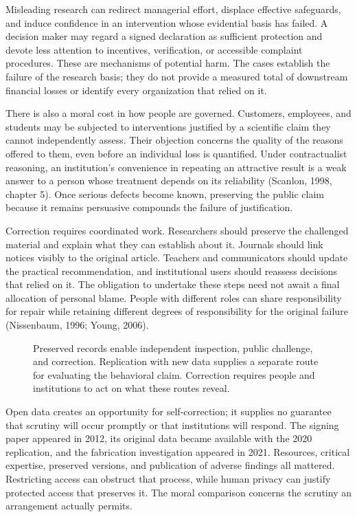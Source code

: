 \noindent \noindent Misleading research can redirect managerial effort, displace
effective safeguards, and induce confidence in an intervention whose
evidential basis has failed. A decision maker may regard a signed
declaration as sufficient protection and devote less attention to
incentives, verification, or accessible complaint procedures. These are
mechanisms of potential harm. The cases establish the failure of the
research basis; they do not provide a measured total of downstream
financial losses or identify every organization that relied on it.

There is also a moral cost in how people are governed. Customers,
employees, and students may be subjected to interventions justified by a
scientific claim they cannot independently assess. Their objection
concerns the quality of the reasons offered to them, even before an
individual loss is quantified. Under contractualist reasoning, an
institution's convenience in repeating an attractive result is a weak
answer to a person whose treatment depends on its reliability (Scanlon,
1998, chapter 5). Once serious defects become known, preserving the
public claim because it remains persuasive compounds the failure of
justification.

Correction requires coordinated work. Researchers should preserve the
challenged material and explain what they can establish about it.
Journals should link notices visibly to the original article. Teachers
and communicators should update the practical recommendation, and
institutional users should reassess decisions that relied on it. The
obligation to undertake these steps need not await a final allocation of
personal blame. People with different roles can share responsibility for
repair while retaining different degrees of responsibility for the
original failure (Nissenbaum, 1996; Young, 2006).

\begin{figure}[htbp]
\centering

\caption{Preserved records enable independent inspection, public challenge, and correction. Replication with new data supplies a separate route for evaluating the behavioral claim. Correction requires people and institutions to act on what these routes reveal.}\label{fig:M09_replication_and_correction}
\end{figure}

Open data creates an opportunity for self-correction; it supplies no
guarantee that scrutiny will occur promptly or that institutions will
respond. The signing paper appeared in 2012, its original data became
available with the 2020 replication, and the fabrication investigation
appeared in 2021. Resources, critical expertise, preserved versions, and
publication of adverse findings all mattered. Restricting access can
obstruct that process, while human privacy can justify protected access
that preserves it. The moral comparison concerns the scrutiny an
arrangement actually permits.

